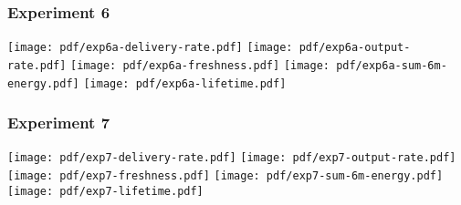 \documentclass{article}
\begin{document}
\subsubsection{Experiment 6}
\texttt{[image: pdf/exp6a-delivery-rate.pdf]}
\texttt{[image: pdf/exp6a-output-rate.pdf]}
\texttt{[image: pdf/exp6a-freshness.pdf]}
\texttt{[image: pdf/exp6a-sum-6m-energy.pdf]}
\texttt{[image: pdf/exp6a-lifetime.pdf]}


\subsubsection{Experiment 7}
\texttt{[image: pdf/exp7-delivery-rate.pdf]}
\texttt{[image: pdf/exp7-output-rate.pdf]}
\texttt{[image: pdf/exp7-freshness.pdf]}
\texttt{[image: pdf/exp7-sum-6m-energy.pdf]}
\texttt{[image: pdf/exp7-lifetime.pdf]}
\end{document}
